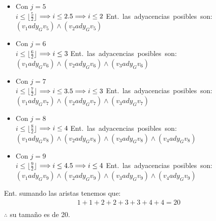 \documentclass{article}
\begin{document}
\begin{justify}
{\begin{enumerate}
\begin{itemize}
        \item Con $j = 5$ \\
          $i \leq \lfloor \frac{5}{2} \rfloor$ $\Longrightarrow i \leq 2.5 \Longrightarrow i \leq 2 \\$ \mbox{Ent. las adyacencias posibles son:}\\
          $(v_1 ady_G v_5) \land (v_2 ady_G v_5)$ \\
          \newpage
        \item Con $j= 6$ \\
          $i \leq \lfloor \frac{6}{2} \rfloor$ $\Longrightarrow i \leq 3 \\$ \mbox{Ent. las adyacencias posibles son:}\\
          $(v_1 ady_G v_6) \land (v_2 ady_G v_6) \land (v_3 ady_G v_6)$\\
        \item Con $j = 7$ \\
          $i \leq \lfloor \frac{7}{2} \rfloor$ $\Longrightarrow i \leq 3.5 \Longrightarrow i \leq 3 \\$ \mbox{Ent. las adyacencias posibles son:}\\
          $(v_1 ady_G v_7) \land (v_2 ady_G v_7) \land (v_3 ady_G v_7)$ \\
        \item Con $j= 8$ \\
          $i \leq \lfloor \frac{8}{2} \rfloor$ $\Longrightarrow i \leq 4 \\$ \mbox{Ent. las adyacencias posibles son:}\\
          $(v_1 ady_G v_8) \land (v_2 ady_G v_8) \land (v_3 ady_G v_8) \land (v_4 ady_G v_8)$ \\
        \item Con $j = 9$ \\
          $i \leq \lfloor \frac{9}{2} \rfloor$ $\Longrightarrow i \leq 4.5 \Longrightarrow i \leq 4 \\$ \mbox{Ent. las adyacencias posibles son:}\\
          $(v_1 ady_G v_9) \land (v_2 ady_G v_9) \land (v_3 ady_G v_9) \land (v_4 ady_G v_9)$ \\
        \end{itemize}
        Ent. sumando las aristas tenemos que: \\
        \begin{align}
          1+1+2+2+3+3+4+4 = 20\\
        \end{align}
        $\therefore $ su tamaño es de 20.

\end{enumerate}}
\end{justify}
\end{document}
